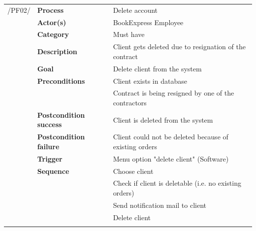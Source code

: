 \documentclass[11pt,a4paper,oneside,svgnames]{report}
\begin{document}
\noindent
\begin{tabular}{p{1.5cm}p{3cm}p{8cm}}
\cellcolor{white}/PF02/	& \textbf{Process} & Delete account\\ 
\cellcolor{white}		& \textbf{Actor(s)} & BookExpress Employee\\ 
\cellcolor{white}		& \textbf{Category} & Must have\\
\cellcolor{white}		& \textbf{Description}	 & Client gets deleted due to resignation of the contract\\ 
\cellcolor{white}		& \textbf{Goal} & Delete client from the system\\
\cellcolor{white}		& \textbf{Preconditions} & Client exists in database\\
\cellcolor{white}		& & Contract is being resigned by one of the contractors\\
\cellcolor{white}		& \textbf{Postcondition success} & Client is deleted from the system\\
\cellcolor{white}		& \textbf{Postcondition failure} & Client could not be deleted because of existing orders\\
\cellcolor{white}		& \textbf{Trigger} & Menu option "delete client" (Software)\\
\cellcolor{white}		& \textbf{Sequence} & Choose client\\
\cellcolor{white}		& & Check if client is deletable (i.e. no existing orders)\\
\cellcolor{white}		& & Send notification mail to client\\
\cellcolor{white}		& & Delete client\\
\cellcolor{white}\hfill \\		
\end{tabular}
\end{document}
